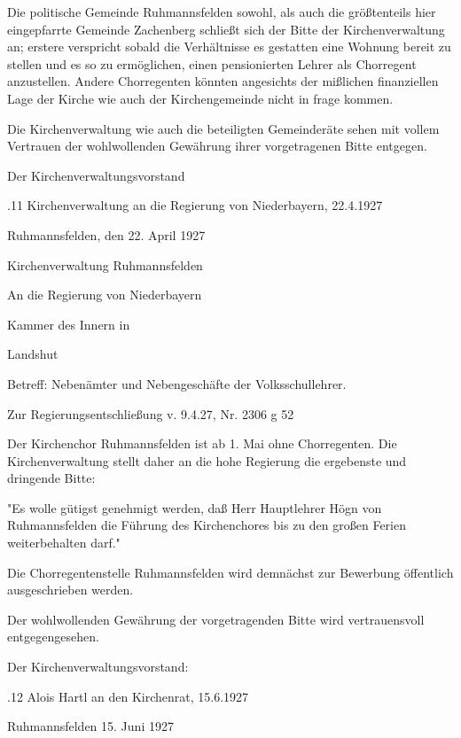 \documentclass{book}
\begin{document}
Die politische Gemeinde Ruhmannsfelden sowohl, als auch die größtenteils hier
eingepfarrte Gemeinde Zachenberg schließt sich der Bitte der Kirchenverwaltung
an; erstere verspricht sobald die Verhältnisse es gestatten eine Wohnung bereit
zu stellen und es so zu ermöglichen, einen pensionierten Lehrer als Chorregent
anzustellen. Andere Chorregenten könnten angesichts der mißlichen finanziellen
Lage der Kirche wie auch der Kirchengemeinde nicht in frage kommen.

Die Kirchenverwaltung wie auch die beteiligten Gemeinderäte sehen mit vollem
Vertrauen der wohlwollenden Gewährung ihrer vorgetragenen Bitte entgegen.



Der Kirchenverwaltungsvorstand

.11 Kirchenverwaltung an die Regierung von Niederbayern, 22.4.1927

Ruhmannsfelden, den 22. April 1927

Kirchenverwaltung Ruhmannsfelden



An die Regierung von Niederbayern

Kammer des Innern in

Landshut



Betreff: Nebenämter und Nebengeschäfte der Volksschullehrer.



Zur Regierungsentschließung v. 9.4.27, Nr. 2306 g 52



Der Kirchenchor Ruhmannsfelden ist ab 1. Mai ohne Chorregenten. Die
Kirchenverwaltung stellt daher an die hohe Regierung die ergebenste und
dringende Bitte:

"Es wolle gütigst genehmigt werden, daß Herr Hauptlehrer Högn von Ruhmannsfelden
die Führung des Kirchenchores bis zu den großen Ferien weiterbehalten darf."



Die Chorregentenstelle Ruhmannsfelden wird demnächst zur Bewerbung öffentlich
ausgeschrieben werden.

Der wohlwollenden Gewährung der vorgetragenden Bitte wird vertrauensvoll
entgegengesehen.



Der Kirchenverwaltungsvorstand:

.12 Alois Hartl an den Kirchenrat, 15.6.1927

Ruhmannsfelden 15. Juni 1927
\end{document}
